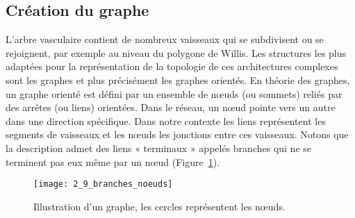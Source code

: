 \subsection{Création du graphe}
\label{sect:graph_creation}
L’arbre vasculaire contient de nombreux vaisseaux qui se subdivisent ou se rejoignent,  par exemple au niveau du polygone de Willis. Les structures les plus adaptées pour la représentation de la topologie de ces architectures complexes sont les graphes et plus précisément les graphes orientés. En théorie des graphes, un graphe orienté est défini par un ensemble de nœuds (ou sommets) reliés par des arrêtes (ou liens) orientées. Dans le réseau, un nœud pointe vers un autre dans une direction spécifique. Dans notre contexte les liens représentent les segments de vaisseaux et les nœuds les jonctions entre ces vaisseaux. Notons que la description admet des liens « terminaux » appelés branches qui ne se terminent pas eux même par un nœud (Figure~\ref{fig:2_9_branches_noeuds}).\\
\begin{figure}[!t]
\centering
\texttt{[image: 2\_9\_branches\_noeuds]}
\caption{Illustration d'un graphe, les cercles représentent les nœuds.}
\label{fig:2_9_branches_noeuds}	
\end{figure}	


